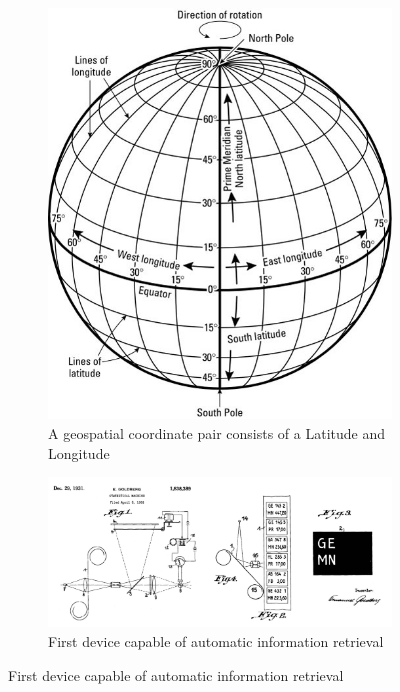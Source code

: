 \documentclass[10pt, conference, compsocconf]{IEEEtran}
\begin{document}
\begin{figure}[h]
\centering
\begin{subfigure}[b]{0.4\textwidth}
\centering
\includegraphics[scale=.3]{images/gps.jpg}
\caption{A geospatial coordinate pair consists of a Latitude and Longitude}
\label{fig:gps}
\end{subfigure}
\begin{subfigure}[b]{0.4\textwidth}
\centering
\includegraphics[scale=.2]{images/first.png}
\caption{First device capable of automatic information retrieval}
\label{fig:first}
\end{subfigure}
\end{figure}
\end{document}

